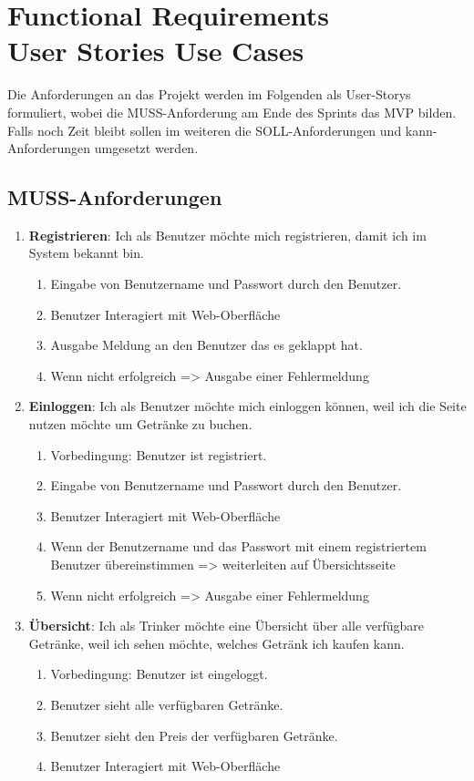 \documentclass[conference,a4paper]{cs-techrep}
\begin{document}
\section{Functional Requirements \textbar{}\\User Stories \textbar{} Use Cases}

Die Anforderungen an das Projekt werden im Folgenden als User-Storys formuliert, wobei die MUSS-Anforderung am Ende des Sprints das MVP bilden. Falls noch Zeit bleibt sollen im weiteren die SOLL-Anforderungen und kann-Anforderungen umgesetzt werden.

\subsection{MUSS-Anforderungen}

\begin{enumerate}[{USM}1]
	
\item \textbf{Registrieren}: Ich als Benutzer möchte mich registrieren, damit ich im System bekannt bin.
	\begin{enumerate}
	\item Eingabe von Benutzername und Passwort durch den Benutzer.
	\item Benutzer Interagiert mit Web-Oberfläche
	\item Ausgabe Meldung an den Benutzer das es geklappt hat.
	\item Wenn nicht erfolgreich => Ausgabe einer Fehlermeldung
	\end{enumerate}

\item \textbf{Einloggen}: Ich als Benutzer möchte mich einloggen können, weil ich die Seite nutzen möchte um Getränke zu buchen.
\begin{enumerate}
	\item Vorbedingung: Benutzer ist registriert.
	\item Eingabe von Benutzername und Passwort durch den Benutzer.
	\item Benutzer Interagiert mit Web-Oberfläche
	\item Wenn der Benutzername und das Passwort mit einem registriertem Benutzer übereinstimmen => weiterleiten auf Übersichtsseite
	\item Wenn nicht erfolgreich => Ausgabe einer Fehlermeldung
\end{enumerate}

\item \textbf{Übersicht}: Ich als Trinker möchte eine Übersicht über alle verfügbare Getränke, weil ich sehen möchte, welches Getränk ich kaufen kann.
\begin{enumerate}
	\item Vorbedingung: Benutzer ist eingeloggt.
	\item Benutzer sieht alle verfügbaren Getränke.
	\item Benutzer sieht den Preis der verfügbaren Getränke.
	\item Benutzer Interagiert mit Web-Oberfläche
\end{enumerate}


\end{enumerate}
\end{document}
